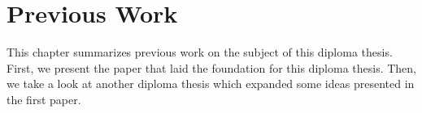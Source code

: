 \chapter{Previous Work}
\label{previous}

This chapter summarizes previous work on the subject of this diploma thesis.
First, we present the paper that laid the foundation for this diploma thesis.
Then, we take a look at another diploma thesis which expanded some ideas presented in the first paper.



